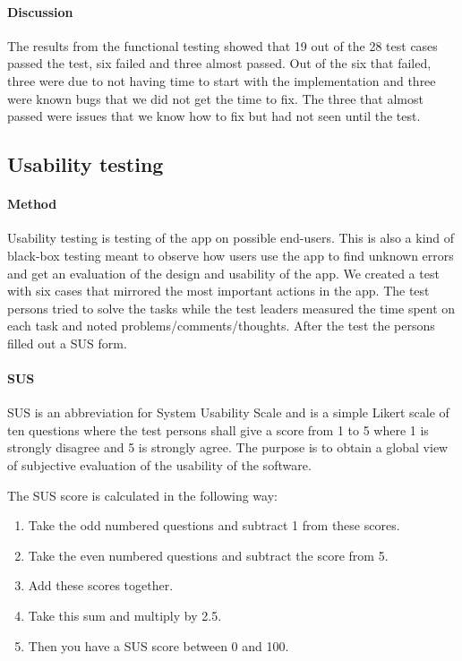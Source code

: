 \paragraph{Discussion}\hfill
\newline
The results from the functional testing showed that 19 out of the 28 test cases passed the test,  six failed and three almost passed. Out of the six that failed, three were due to not having time to start with the implementation and three were known bugs that we did not get the time to fix. The three that almost passed were issues that we know how to fix but had not seen until the test.
\subsection{Usability testing}
\paragraph{Method}\hfill
\newline
Usability testing is testing of the app on possible end-users. This is also a kind of black-box testing meant to observe how users use the app to find unknown errors and get an evaluation of the design and usability of the app. We created a test with six cases that mirrored the most important actions in the app. The test persons tried to solve the tasks while the test leaders measured the time spent on each task and noted problems/comments/thoughts. After the test the persons filled out a SUS form.
\paragraph{SUS}\hfill
\newline
SUS is an abbreviation for System Usability Scale \cite{bib:sus} and is a simple Likert scale of ten questions where the test persons shall give a score from 1 to 5 where 1 is strongly disagree and 5 is strongly agree. The purpose is to obtain a global view of subjective evaluation of the usability of the software.

\newpage

			The SUS score is calculated in the following way:
				\begin{enumerate}
					\item{}Take the odd numbered questions and subtract 1 from these scores.
					\item{}Take the even numbered questions and subtract the score from 5.
					\item{}Add these scores together. 
					\item{}Take this sum and multiply by 2.5.
					\item{}Then you have a SUS score between 0 and 100.
				\end{enumerate}
